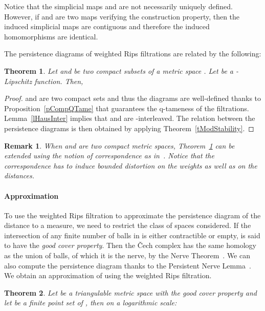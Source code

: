 \documentclass[a4paper]{article}
\newtheorem{theorem}{Theorem}[section]
\newtheorem{remark}{Remark}
\begin{document}
Notice that the simplicial maps  and  are not necessarily uniquely defined.
However, if  and  are two maps verifying the construction property, then the induced simplicial maps are contiguous and therefore the induced homomorphisms are identical.

The persistence diagrams of weighted Rips filtrations are related by the following:

\begin{theorem}\label{tPQsamespace}
Let  and  be two compact subsets of a metric space .
Let  be a -Lipschitz function.
Then,

\end{theorem}

\begin{proof}
 and  are two compact sets and thus the diagrams are well-defined thanks to Proposition~\ref{pCompQTame} that guarantees the q-tameness of the filtrations. 
Lemma~\ref{lHausInter} implies that  and  are -interleaved.
The relation between the persistence diagrams is then obtained by applying Theorem~\ref{tModStability}.
\end{proof}

\begin{remark}
When  and  are two compact metric spaces, Theorem~\ref{tPQsamespace} can be extended using the notion of correspondence as in~\cite{psgcCDO}.
Notice that the correspondence has to induce bounded distortion on the weights as well as on the distances.
\end{remark}

\paragraph{Approximation\\}
To use the weighted Rips filtration to approximate the persistence diagram of the distance to a measure, we need to restrict the class of spaces considered.
If the intersection of any finite number of balls in  is either contractible or empty,  is said to have the \emph{good cover property}.
Then the \v{C}ech complex has the same homology as the union of balls, of which it is the nerve, by the Nerve Theorem~\cite{atH}.
We can also compute the persistence diagram thanks to the Persistent Nerve Lemma~\cite{tpbresCO}.
We obtain an approximation of  using the weighted Rips filtration.

\begin{theorem}\label{thm:approximating_dPP_with_weighted_rips}
Let  be a triangulable metric space with the good cover property and let  be a finite point set of , then on a logarithmic scale:

\end{theorem}
\end{document}
